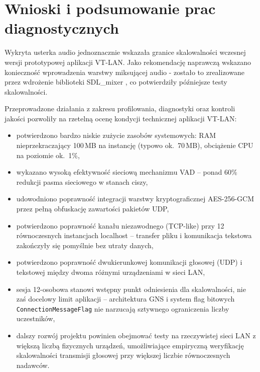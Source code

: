 \section{Wnioski i podsumowanie prac diagnostycznych}
\label{sec:db_wnioski}

Wykryta usterka audio jednoznacznie wskazała granice skalowalności
wczesnej wersji prototypowej aplikacji VT-LAN. Jako rekomendację naprawczą
wskazano konieczność wprowadzenia warstwy miksującej audio - zostało to
zrealizowane przez wdrożenie biblioteki SDL\_mixer \cite{SDLMixer},
co potwierdziły późniejsze testy skalowalności.

Przeprowadzone działania z zakresu profilowania, diagnostyki oraz kontroli
jakości pozwoliły na rzetelną ocenę kondycji technicznej aplikacji VT-LAN:

\begin{itemize}
	\item potwierdzono bardzo niskie zużycie zasobów systemowych:
	RAM nieprzekraczający 100\,MB na instancję (typowo ok.\ 70\,MB),
	obciążenie CPU na poziomie ok.\ 1\%,
	\item wykazano wysoką efektywność sieciową mechanizmu VAD --
	ponad 60\% redukcji pasma sieciowego w stanach ciszy,
	\item udowodniono poprawność integracji warstwy kryptograficznej
	AES-256-GCM przez pełną obfuskację zawartości pakietów UDP,
	\item potwierdzono poprawność kanału niezawodnego (TCP-like) przy
	12 równoczesnych instancjach localhost -- transfer pliku
	i komunikacja tekstowa zakończyły się pomyślnie bez utraty danych,
	\item potwierdzono poprawność dwukierunkowej komunikacji głosowej (UDP)
	i tekstowej między dwoma różnymi urządzeniami w sieci LAN,
	\item sesja 12-osobowa stanowi wstępny punkt odniesienia dla
	skalowalności, nie zaś docelowy limit aplikacji -- architektura
	GNS i system flag bitowych \texttt{ConnectionMessageFlag}
	nie narzucają sztywnego ograniczenia liczby uczestników,
	\item dalszy rozwój projektu powinien obejmować testy na rzeczywistej
	sieci LAN z większą liczbą fizycznych urządzeń, umożliwiające
	empiryczną weryfikację skalowalności transmisji głosowej
	przy większej liczbie równoczesnych nadawców.
\end{itemize}
